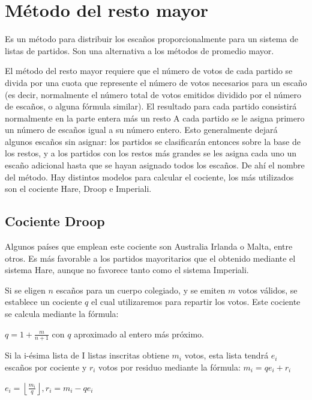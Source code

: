 \documentclass[12pt,a4paper,]{book}
\numberwithin{dummy}{section}
\theoremstyle{ocrenumbox}
\theoremstyle{blacknumex}
\theoremstyle{blacknumbox}
\theoremstyle{ocrenum}
\theoremstyle{ocrenum}
\begin{document}
\hypertarget{muxe9todo-del-resto-mayor}{%
\section{Método del resto mayor}\label{muxe9todo-del-resto-mayor}}

Es un método para distribuir los escaños proporcionalmente para un
sistema de listas de partidos. Son una alternativa a los métodos de
promedio mayor.

El método del resto mayor requiere que el número de votos de cada
partido se divida por una cuota que represente el número de votos
necesarios para un escaño (es decir, normalmente el número total de
votos emitidos dividido por el número de escaños, o alguna fórmula
similar). El resultado para cada partido consistirá normalmente en la
parte entera más un resto A cada partido se le asigna primero un número
de escaños igual a su número entero. Esto generalmente dejará algunos
escaños sin asignar: los partidos se clasificarán entonces sobre la base
de los restos, y a los partidos con los restos más grandes se les asigna
cada uno un escaño adicional hasta que se hayan asignado todos los
escaños. De ahí el nombre del método. Hay distintos modelos para
calcular el cociente, los más utilizados son el cociente Hare, Droop e
Imperiali.

\hypertarget{cociente-droop}{%
\subsection{Cociente Droop}\label{cociente-droop}}

Algunos países que emplean este cociente son Australia Irlanda o Malta,
entre otros. Es más favorable a los partidos mayoritarios que el
obtenido mediante el sistema Hare, aunque no favorece tanto como el
sistema Imperiali.

Si se eligen \({n}\) escaños para un cuerpo colegiado, y se emiten
\({m}\) votos válidos, se establece un cociente \({q}\) el cual
utilizaremos para repartir los votos. Este cociente se calcula mediante
la fórmula:

\({q=1+{\frac {m}{n+1}}}\) con \(q\) aproximado al entero más próximo.

Si la i-ésima lista de I listas inscritas obtiene \({m_{i}}\) votos,
esta lista tendrá \({e_{i}}\) escaños por cociente y \({r_{i}}\) votos
por residuo mediante la fórmula: \({m_{i}=qe_{i}+r_{i}}\)

\({e_{i}=\left\lfloor {\frac {m_{i}}{q}}\right\rfloor ,r_{i}=m_{i}-qe_{i}}\)
\end{document}
